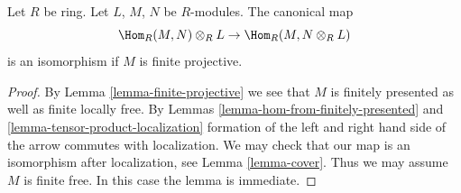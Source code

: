\begin{lemma}
\label{lemma-evaluation-map-iso-finite-projective}
Let $R$ be ring. Let $L$, $M$, $N$ be $R$-modules.
The canonical map
$$
\Hom_R(M, N) \otimes_R L \to \Hom_R(M, N \otimes_R L)
$$
is an isomorphism if $M$ is finite projective.
\end{lemma}

\begin{proof}
By Lemma \ref{lemma-finite-projective} we see that $M$
is finitely presented as well as finite locally free.
By Lemmas \ref{lemma-hom-from-finitely-presented} and
\ref{lemma-tensor-product-localization} formation of
the left and right hand side of the arrow commutes with
localization. We may check that our map is an isomorphism
after localization, see Lemma \ref{lemma-cover}.
Thus we may assume $M$ is finite free. In this case
the lemma is immediate.
\end{proof}


 


